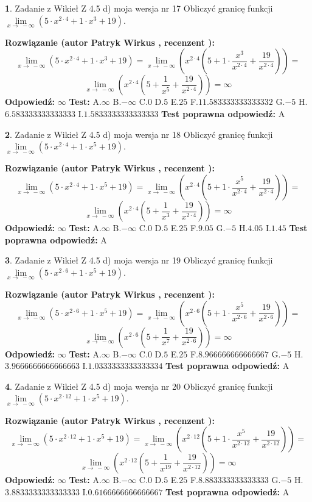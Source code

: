 \documentclass[12pt, a4paper]{article}
\theoremstyle{definition} %
\newtheorem{zad}{}
\newcommand{\zadStart}[1]{\begin{zad}#1\newline}
\newcommand{\zadStop}{\end{zad}}
\newcommand{\rozwStart}[2]{\noindent \textbf{Rozwiązanie (autor #1 , recenzent #2): }\newline}
\newcommand{\rozwStop}{\newline}
\newcommand{\odpStart}{\noindent \textbf{Odpowiedź:}\newline}
\newcommand{\odpStop}{\newline}
\newcommand{\testStart}{\noindent \textbf{Test:}\newline}
\newcommand{\testStop}{\newline}
\newcommand{\kluczStart}{\noindent \textbf{Test poprawna odpowiedź:}\newline}
\newcommand{\kluczStop}{\newline}
\begin{document}
\zadStart{Zadanie z Wikieł Z 4.5 d) moja wersja nr 17}
Obliczyć granicę funkcji  $\lim\limits_{x\to\ -\infty}(5 \cdot x^{2\cdot4}+1 \cdot x^{3}+19)$.
\zadStop
\rozwStart{Patryk Wirkus}{}
$$\lim\limits_{x\to\ -\infty}(5 \cdot x^{2\cdot4}+1 \cdot x^{3}+19) = \lim\limits_{x\to\ -\infty}(x^{2\cdot4}(5 +1 \cdot \frac{x^{3}}{x^{2\cdot4}}+\frac{19}{x^{2\cdot4}})) =$$ $$\lim\limits_{x\to\ -\infty}(x^{2\cdot4}(5 +\frac{1}{x^{5}}+\frac{19}{x^{2\cdot4}})) =\infty$$
\rozwStop
\odpStart
$\infty$
\odpStop
\testStart
A.$\infty$ B.$-\infty$ C.$0$ D.$5$ E.$25$
F.$11.583333333333332$ G.$-5$
H.$6.583333333333333$
I.$1.5833333333333333$
\testStop
\kluczStart
A
\kluczStop



\zadStart{Zadanie z Wikieł Z 4.5 d) moja wersja nr 18}
Obliczyć granicę funkcji  $\lim\limits_{x\to\ -\infty}(5 \cdot x^{2\cdot4}+1 \cdot x^{5}+19)$.
\zadStop
\rozwStart{Patryk Wirkus}{}
$$\lim\limits_{x\to\ -\infty}(5 \cdot x^{2\cdot4}+1 \cdot x^{5}+19) = \lim\limits_{x\to\ -\infty}(x^{2\cdot4}(5 +1 \cdot \frac{x^{5}}{x^{2\cdot4}}+\frac{19}{x^{2\cdot4}})) =$$ $$\lim\limits_{x\to\ -\infty}(x^{2\cdot4}(5 +\frac{1}{x^{3}}+\frac{19}{x^{2\cdot4}})) =\infty$$
\rozwStop
\odpStart
$\infty$
\odpStop
\testStart
A.$\infty$ B.$-\infty$ C.$0$ D.$5$ E.$25$
F.$9.05$ G.$-5$
H.$4.05$
I.$1.45$
\testStop
\kluczStart
A
\kluczStop



\zadStart{Zadanie z Wikieł Z 4.5 d) moja wersja nr 19}
Obliczyć granicę funkcji  $\lim\limits_{x\to\ -\infty}(5 \cdot x^{2\cdot6}+1 \cdot x^{5}+19)$.
\zadStop
\rozwStart{Patryk Wirkus}{}
$$\lim\limits_{x\to\ -\infty}(5 \cdot x^{2\cdot6}+1 \cdot x^{5}+19) = \lim\limits_{x\to\ -\infty}(x^{2\cdot6}(5 +1 \cdot \frac{x^{5}}{x^{2\cdot6}}+\frac{19}{x^{2\cdot6}})) =$$ $$\lim\limits_{x\to\ -\infty}(x^{2\cdot6}(5 +\frac{1}{x^{7}}+\frac{19}{x^{2\cdot6}})) =\infty$$
\rozwStop
\odpStart
$\infty$
\odpStop
\testStart
A.$\infty$ B.$-\infty$ C.$0$ D.$5$ E.$25$
F.$8.966666666666667$ G.$-5$
H.$3.9666666666666663$
I.$1.0333333333333334$
\testStop
\kluczStart
A
\kluczStop



\zadStart{Zadanie z Wikieł Z 4.5 d) moja wersja nr 20}
Obliczyć granicę funkcji  $\lim\limits_{x\to\ -\infty}(5 \cdot x^{2\cdot12}+1 \cdot x^{5}+19)$.
\zadStop
\rozwStart{Patryk Wirkus}{}
$$\lim\limits_{x\to\ -\infty}(5 \cdot x^{2\cdot12}+1 \cdot x^{5}+19) = \lim\limits_{x\to\ -\infty}(x^{2\cdot12}(5 +1 \cdot \frac{x^{5}}{x^{2\cdot12}}+\frac{19}{x^{2\cdot12}})) =$$ $$\lim\limits_{x\to\ -\infty}(x^{2\cdot12}(5 +\frac{1}{x^{19}}+\frac{19}{x^{2\cdot12}})) =\infty$$
\rozwStop
\odpStart
$\infty$
\odpStop
\testStart
A.$\infty$ B.$-\infty$ C.$0$ D.$5$ E.$25$
F.$8.883333333333333$ G.$-5$
H.$3.8833333333333333$
I.$0.6166666666666667$
\testStop
\kluczStart
A
\kluczStop
\end{document}
